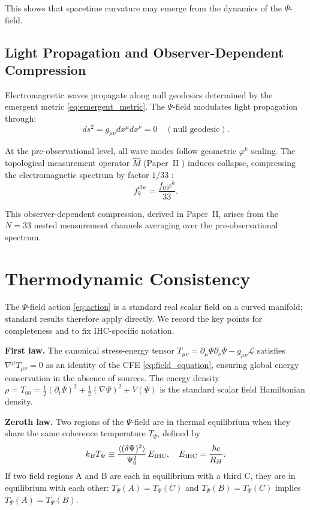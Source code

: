This shows that spacetime curvature may emerge from the dynamics of the $\Psi$-field.

\subsection{Light Propagation and Observer-Dependent Compression}

Electromagnetic waves propagate along null geodesics determined by the emergent metric \eqref{eq:emergent_metric}. The $\Psi$-field modulates light propagation through:
\begin{equation}
ds^2 = g_{\mu\nu}dx^\mu dx^\nu = 0 \quad (\text{null geodesic}).
\end{equation}

At the pre-observational level, all wave modes follow geometric $\varphi^k$ scaling. The topological measurement operator $\hat{M}$ (Paper~II \citep{Peacock2026b_qm}) induces collapse, compressing the electromagnetic spectrum by factor $1/33$ \citep{Peacock2026b_qm}:
\begin{equation}
f_k^{\text{obs}} = \frac{f_0 \varphi^k}{33}.
\end{equation}

This observer-dependent compression, derived in Paper~II, arises from the $N = 33$ nested measurement channels averaging over the pre-observational spectrum.

\section{Thermodynamic Consistency}

The $\Psi$-field action \eqref{eq:action} is a standard real scalar field on a curved
manifold; standard results \citep{Carroll2004} therefore apply directly.
We record the key points for completeness and to fix IHC-specific notation.

\textbf{First law.}
The canonical stress-energy tensor
$T_{\mu\nu} = \partial_\mu\Psi\partial_\nu\Psi - g_{\mu\nu}\mathcal{L}$
satisfies $\nabla^\mu T_{\mu\nu} = 0$ as an identity of the CFE \eqref{eq:field_equation},
ensuring global energy conservation in the absence of sources.
The energy density $\rho = T_{00} = \frac{1}{2}(\partial_t\Psi)^2 + \frac{1}{2}(\nabla\Psi)^2 + V(\Psi)$
is the standard scalar field Hamiltonian density.

\textbf{Zeroth law.}
Two regions of the $\Psi$-field are in thermal equilibrium when they share
the same coherence temperature $T_\Psi$, defined by
\begin{equation}
k_B T_\Psi \equiv \frac{\langle(\delta\Psi)^2\rangle}{\Psi_0^2}\,E_{\rm IHC},
\quad E_{\rm IHC} = \frac{\hbar c}{R_H}.
\end{equation}
If two field regions A and B are each in equilibrium with a third C, they are
in equilibrium with each other: $T_\Psi(A) = T_\Psi(C)$ and
$T_\Psi(B) = T_\Psi(C)$ implies $T_\Psi(A) = T_\Psi(B)$.


